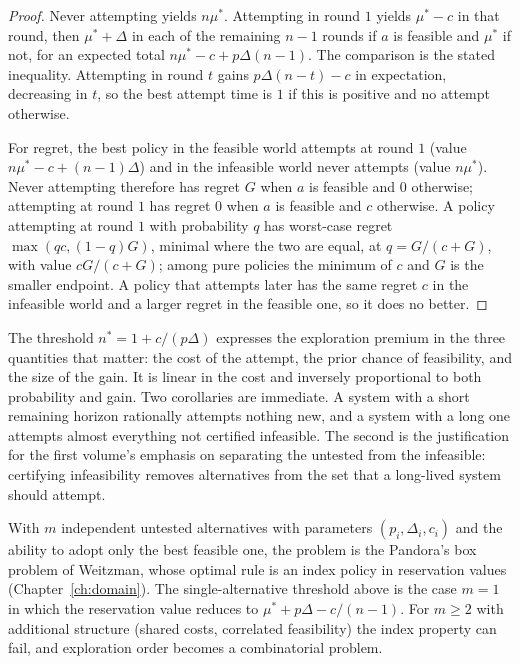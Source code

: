 \begin{proof}
Never attempting yields $n\mu^*$. Attempting in round $1$ yields $\mu^*-c$ in that round, then $\mu^*+\Delta$ in each of the remaining $n-1$ rounds if $a$ is feasible and $\mu^*$ if not, for an expected total $n\mu^*-c+p\Delta(n-1)$. The comparison is the stated inequality. Attempting in round $t$ gains $p\Delta(n-t)-c$ in expectation, decreasing in $t$, so the best attempt time is $1$ if this is positive and no attempt otherwise.

For regret, the best policy in the feasible world attempts at round $1$ (value $n\mu^*-c+(n-1)\Delta$) and in the infeasible world never attempts (value $n\mu^*$). Never attempting therefore has regret $G$ when $a$ is feasible and $0$ otherwise; attempting at round $1$ has regret $0$ when $a$ is feasible and $c$ otherwise. A policy attempting at round $1$ with probability $q$ has worst-case regret $\max(qc,(1-q)G)$, minimal where the two are equal, at $q=G/(c+G)$, with value $cG/(c+G)$; among pure policies the minimum of $c$ and $G$ is the smaller endpoint. A policy that attempts later has the same regret $c$ in the infeasible world and a larger regret in the feasible one, so it does no better.
\end{proof}

The threshold $n^*=1+c/(p\Delta)$ expresses the exploration premium in the three quantities that matter: the cost of the attempt, the prior chance of feasibility, and the size of the gain. It is linear in the cost and inversely proportional to both probability and gain. Two corollaries are immediate. A system with a short remaining horizon rationally attempts nothing new, and a system with a long one attempts almost everything not certified infeasible. The second is the justification for the first volume's emphasis on separating the untested from the infeasible: certifying infeasibility removes alternatives from the set that a long-lived system should attempt.

\begin{example}\label{ex:several}
With $m$ independent untested alternatives with parameters $(p_i,\Delta_i,c_i)$ and the ability to adopt only the best feasible one, the problem is the Pandora's box problem of Weitzman, whose optimal rule is an index policy in reservation values (Chapter~\ref{ch:domain}). The single-alternative threshold above is the case $m=1$ in which the reservation value reduces to $\mu^*+p\Delta-c/(n-1)$. For $m\ge2$ with additional structure (shared costs, correlated feasibility) the index property can fail, and exploration order becomes a combinatorial problem.
\end{example}

